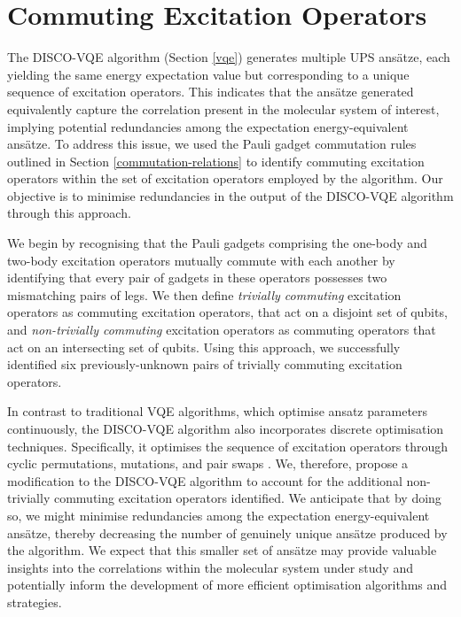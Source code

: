 \section{Commuting Excitation Operators}%
\label{operator-commutations}

The DISCO-VQE algorithm (Section \ref{vqe}) generates multiple UPS ansätze, each yielding the same energy expectation value but corresponding to a unique sequence of excitation operators. This indicates that the ansätze generated equivalently capture the correlation present in the molecular system of interest, implying potential redundancies among the expectation energy-equivalent ansätze. To address this issue, we used the Pauli gadget commutation rules outlined in Section \ref{commutation-relations} to identify commuting excitation operators within the set of excitation operators employed by the algorithm. Our objective is to minimise redundancies in the output of the DISCO-VQE algorithm through this approach.

We begin by recognising that the Pauli gadgets comprising the one-body and two-body excitation operators mutually commute with each another by identifying that every pair of gadgets in these operators possesses two mismatching pairs of legs. We then define \textit{trivially commuting} excitation operators as commuting excitation operators, that act on a disjoint set of qubits, and \textit{non-trivially commuting} excitation operators as commuting operators that act on an intersecting set of qubits. Using this approach, we successfully identified six previously-unknown pairs of trivially commuting excitation operators.

In contrast to traditional VQE algorithms, which optimise ansatz parameters continuously, the DISCO-VQE algorithm also incorporates discrete optimisation techniques. Specifically, it optimises the sequence of excitation operators through cyclic permutations, mutations, and pair swaps \cite{Burton2023}. We, therefore, propose a modification to the DISCO-VQE algorithm to account for the additional non-trivially commuting excitation operators identified. We anticipate that by doing so, we might minimise redundancies among the expectation energy-equivalent ansätze, thereby decreasing the number of genuinely unique ansätze produced by the algorithm. We expect that this smaller set of ansätze may provide valuable insights into the correlations within the molecular system under study and potentially inform the development of more efficient optimisation algorithms and strategies.

